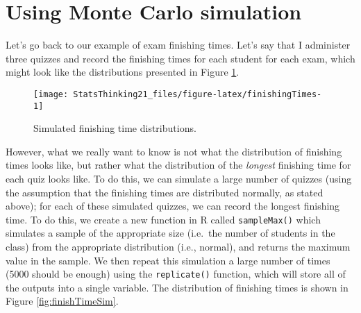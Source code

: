 \documentclass[]{book}
\newenvironment{Shaded}{\begin{snugshade}}{\end{snugshade}}
\newcommand{\KeywordTok}[1]{\textcolor[rgb]{0.13,0.29,0.53}{\textbf{#1}}}
\newcommand{\DataTypeTok}[1]{\textcolor[rgb]{0.13,0.29,0.53}{#1}}
\newcommand{\DecValTok}[1]{\textcolor[rgb]{0.00,0.00,0.81}{#1}}
\newcommand{\FloatTok}[1]{\textcolor[rgb]{0.00,0.00,0.81}{#1}}
\newcommand{\StringTok}[1]{\textcolor[rgb]{0.31,0.60,0.02}{#1}}
\newcommand{\CommentTok}[1]{\textcolor[rgb]{0.56,0.35,0.01}{\textit{#1}}}
\newcommand{\ControlFlowTok}[1]{\textcolor[rgb]{0.13,0.29,0.53}{\textbf{#1}}}
\newcommand{\NormalTok}[1]{#1}
\theoremstyle{definition}
\theoremstyle{definition}
\theoremstyle{definition}
\theoremstyle{remark}
\begin{document}
\section{Using Monte Carlo
simulation}\label{using-monte-carlo-simulation}

Let's go back to our example of exam finishing times. Let's say that I
administer three quizzes and record the finishing times for each student
for each exam, which might look like the distributions presented in
Figure \ref{fig:finishingTimes}.

\begin{figure}
\texttt{[image: StatsThinking21\_files/figure-latex/finishingTimes-1]} \caption{Simulated finishing time distributions.}\label{fig:finishingTimes}
\end{figure}

However, what we really want to know is not what the distribution of
finishing times looks like, but rather what the distribution of the
\emph{longest} finishing time for each quiz looks like. To do this, we
can simulate a large number of quizzes (using the assumption that the
finishing times are distributed normally, as stated above); for each of
these simulated quizzes, we can record the longest finishing time. To do
this, we create a new function in R called \texttt{sampleMax()} which
simulates a sample of the appropriate size (i.e.~the number of students
in the class) from the appropriate distribution (i.e., normal), and
returns the maximum value in the sample. We then repeat this simulation
a large number of times (5000 should be enough) using the
\texttt{replicate()} function, which will store all of the outputs into
a single variable. The distribution of finishing times is shown in
Figure \ref{fig:finishTimeSim}.

\begin{Shaded}
\end{Shaded}
\end{document}
